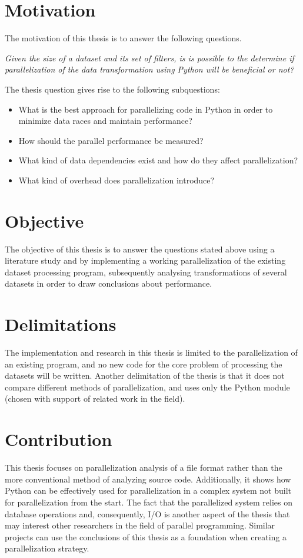 \section{Motivation}
The motivation of this thesis is to answer the following questions.

\emph{Given the size of a dataset and its set of filters, is is possible to the determine 
if parallelization of the data transformation using Python will be beneficial or not?}

The thesis question gives rise to the following subquestions:
\begin{itemize}
    \item What is the best approach for parallelizing code in Python in order to minimize data races and maintain performance?
    \item How should the parallel performance be measured?
    \item What kind of data dependencies exist and how do they affect parallelization?
    \item What kind of overhead does parallelization introduce?
\end{itemize}

\section{Objective}
The objective of this thesis is to answer the questions stated above using a literature study and by implementing a working parallelization
of the existing dataset processing program, subsequently analysing transformations of several datasets in order to draw conclusions about performance.

\section{Delimitations}
The implementation and research in this thesis is limited to the parallelization of an existing program, and no new code for the core problem
of processing the datasets will be written. Another delimitation of the thesis is that it does not compare different methods of parallelization,
and uses only the Python  module (chosen with support of related work in the field).

\section{Contribution}
This thesis focuses on parallelization analysis of a file format rather than the more conventional method of analyzing source code. Additionally,
it shows how Python can be effectively used for parallelization in a complex system not built for parallelization from the start. The fact that
the parallelized system relies on database operations and, consequently, I/O is another aspect of the thesis that may interest other researchers
in the field of parallel programming. Similar projects can use the conclusions of this thesis as a foundation when creating a parallelization strategy.
